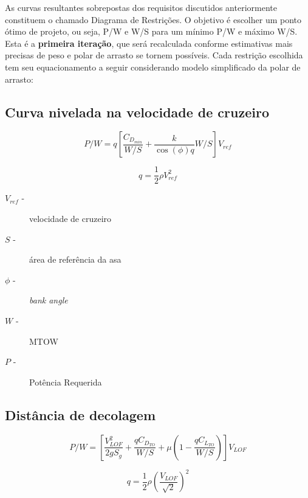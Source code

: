 As curvas resultantes sobrepostas dos requisitos discutidos anteriormente constituem o chamado Diagrama de Restrições.
O objetivo é escolher um ponto ótimo de projeto, ou seja, P/W e W/S para um mínimo P/W e máximo W/S.
Esta é a \textbf{primeira iteração}, que será recalculada conforme estimativas mais precisas de peso e polar de arrasto se tornem possíveis.
Cada restrição escolhida tem seu equacionamento a seguir considerando modelo simplificado da polar de arrasto:



\subsection{Curva nivelada na velocidade de cruzeiro }
\begin{equation}
P/W = q \left[\frac{C_{D_{min}}}{W/S} + \frac{k}{\cos(\phi)q} W/S \right] V_{ref}
\end{equation}

\begin{equation}
q = \frac{1}{2} \rho V_{ref}^2
\end{equation}

\begin{description}
 \item[$V_{ref}$  -]velocidade de cruzeiro
 \item[$S$ -]área de referência da asa
 \item[$\phi$  -]\textit{bank angle}
 \item[$W$  -]MTOW
 \item[$P$  -]Potência Requerida
\end{description}

\subsection{Distância de decolagem}
\begin{equation}
P/W = \left[\frac{V_{LOF}^2}{2 g S_g} + \frac{q C_{D_{TO}}}{W/S} + \mu \left(1 - \frac{q C_{L_{TO}}}{W/S} \right) \right] V_{LOF}
\end{equation}

\begin{equation}
q = \frac{1}{2} \rho \left(\frac{V_{LOF}}{\sqrt{2}} \right)^2
\end{equation}
 
